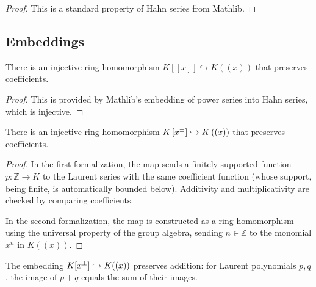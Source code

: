 \begin{proof}
\leanok
This is a standard property of Hahn series from Mathlib.
\end{proof}

\subsection{Embeddings}

\begin{lemma}
\label{lem.fps.laure.ps-embed}
\leanhelper
\leanok
There is an injective ring homomorphism
$K\left[\left[x\right]\right] \hookrightarrow K\left(\left(x\right)\right)$
that preserves coefficients.
\end{lemma}

\begin{proof}
\leanok
This is provided by Mathlib's embedding of power series into
Hahn series, which is injective.
\end{proof}

\begin{lemma}
\label{lem.fps.laure.laupol-embed}
\leanhelper
\leanok
There is an injective ring homomorphism
$K\left[x^{\pm}\right] \hookrightarrow K\left(\left(x\right)\right)$
that preserves coefficients.
\end{lemma}

\begin{proof}
\leanok
In the first formalization, the map sends a finitely supported function
$p : \mathbb{Z} \to K$ to the Laurent series with the same coefficient function
(whose support, being finite, is automatically bounded below).
Additivity and multiplicativity are checked by comparing coefficients.

In the second formalization, the map is constructed as a ring homomorphism
using the universal property of the group algebra, sending
$n \in \mathbb{Z}$ to the monomial $x^n$ in $K((x))$.
\end{proof}

\begin{lemma}
\label{lem.fps.laure.laupol-embed-add}
\leanhelper
\leanok
The embedding $K[x^{\pm}] \hookrightarrow K((x))$ preserves addition:
for Laurent polynomials $p, q$, the image of $p + q$ equals
the sum of their images.
\end{lemma}

